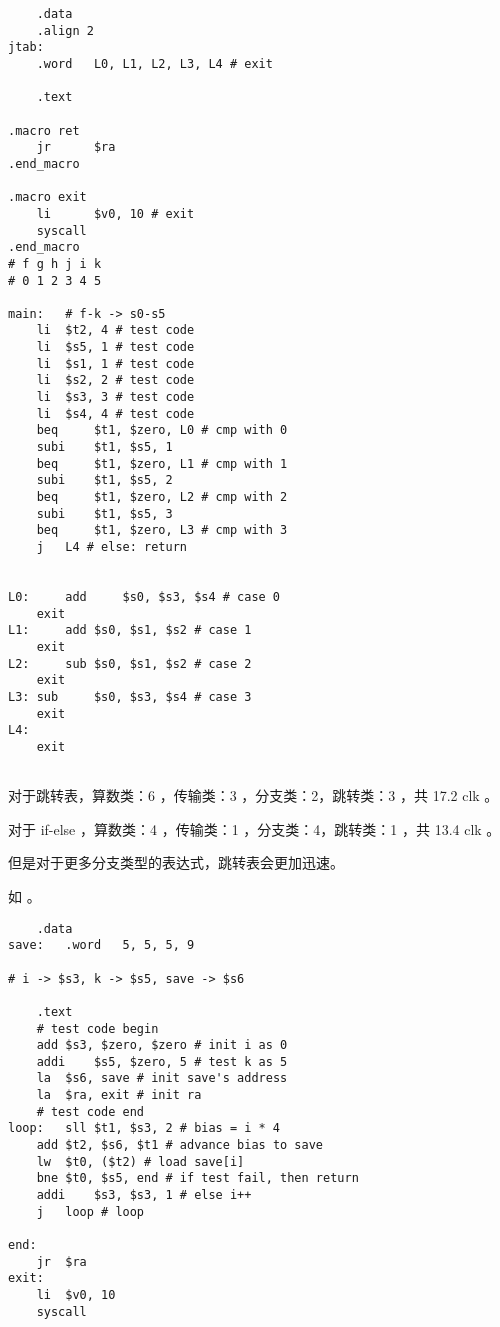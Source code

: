 \documentclass[lang=cn,11pt,a4paper,cite=authoryear]{elegantpaper}
\begin{document}
\begin{lstlisting}
	.data
	.align 2
jtab:
	.word	L0, L1, L2, L3, L4 # exit

	.text 

.macro ret
	jr   	$ra
.end_macro 

.macro exit
	li      $v0, 10	# exit
	syscall
.end_macro
# f g h j i k
# 0 1 2 3 4 5

main:	# f-k -> s0-s5
	li	$t2, 4 # test code 
	li	$s5, 1 # test code 
	li	$s1, 1 # test code 
	li	$s2, 2 # test code 
	li	$s3, 3 # test code 
	li	$s4, 4 # test code 
	beq 	$t1, $zero, L0 # cmp with 0
	subi	$t1, $s5, 1
 	beq 	$t1, $zero, L1 # cmp with 1
	subi	$t1, $s5, 2
	beq 	$t1, $zero, L2 # cmp with 2
	subi	$t1, $s5, 3
	beq 	$t1, $zero, L3 # cmp with 3
	j 	L4 # else: return

	
L0: 	add 	$s0, $s3, $s4 # case 0
	exit 
L1: 	add	$s0, $s1, $s2 # case 1
	exit
L2: 	sub	$s0, $s1, $s2 # case 2
	exit
L3:	sub 	$s0, $s3, $s4 # case 3
	exit
L4: 				
	exit
	
\end{lstlisting}    


对于跳转表，算数类：6 ，传输类：3 ，分支类：2，跳转类：3 ，共 17.2 clk 。

对于 if-else ，算数类：4 ，传输类：1 ，分支类：4，跳转类：1 ，共 13.4 clk 。

但是对于更多分支类型的表达式，跳转表会更加迅速。


如 。




\begin{lstlisting}
 	.data
save:	.word 	5, 5, 5, 9

# i -> $s3, k -> $s5, save -> $s6

	.text
	# test code begin
	add	$s3, $zero, $zero # init i as 0
	addi	$s5, $zero, 5 # test k as 5
	la	$s6, save # init save's address 
	la 	$ra, exit # init ra
	# test code end
loop:	sll	$t1, $s3, 2 # bias = i * 4
	add	$t2, $s6, $t1 # advance bias to save 
	lw	$t0, ($t2) # load save[i]
	bne	$t0, $s5, end # if test fail, then return
	addi	$s3, $s3, 1 # else i++
	j	loop # loop

end:	
	jr	$ra
exit:	
	li	$v0, 10
	syscall
	
\end{lstlisting}    

\end{document}
